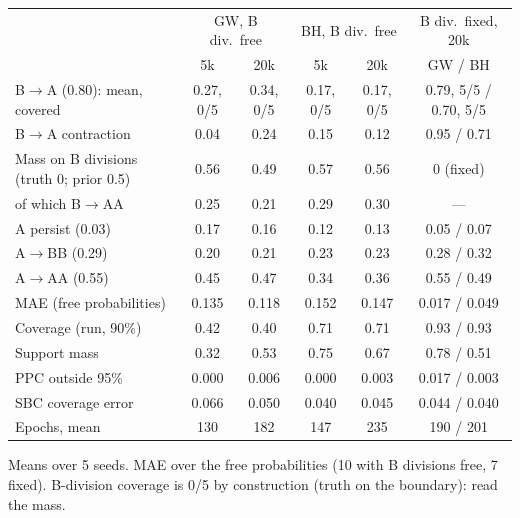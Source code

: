 \documentclass[10pt,a4paper]{article}
\newcommand{\blk}[1]{\par\needspace{5\baselineskip}\smallskip{\sffamily\bfseries\color{inkgray}#1}\par}
\newcommand{\Comment}{\blk{Comment}}
\renewcommand{\blk}[1]{\par\Needspace*{5\baselineskip}\smallskip{\sffamily\bfseries\color{inkgray}#1}\par}
\begin{document}
\begin{center}\footnotesize
\begin{tabular}{@{}lccccc@{}}\toprule
 & \multicolumn{2}{c}{GW, B div.\ free} & \multicolumn{2}{c}{BH, B div.\ free} & B div.\ fixed, 20k \\
 & 5k & 20k & 5k & 20k & GW / BH \\\midrule
B$\to$A (0.80): mean, covered & 0.27, 0/5 & 0.34, 0/5 & 0.17, 0/5 & 0.17, 0/5 & 0.79, 5/5 / 0.70, 5/5 \\
B$\to$A contraction & 0.04 & 0.24 & 0.15 & 0.12 & 0.95 / 0.71 \\
Mass on B divisions (truth 0; prior 0.5) & 0.56 & 0.49 & 0.57 & 0.56 & 0 (fixed) \\
\quad of which B$\to$AA & 0.25 & 0.21 & 0.29 & 0.30 & --- \\
A persist (0.03) & 0.17 & 0.16 & 0.12 & 0.13 & 0.05 / 0.07 \\
A$\to$BB (0.29) & 0.20 & 0.21 & 0.23 & 0.23 & 0.28 / 0.32 \\
A$\to$AA (0.55) & 0.45 & 0.47 & 0.34 & 0.36 & 0.55 / 0.49 \\
MAE (free probabilities) & 0.135 & 0.118 & 0.152 & 0.147 & 0.017 / 0.049 \\
Coverage (run, 90\%) & 0.42 & 0.40 & 0.71 & 0.71 & 0.93 / 0.93 \\
Support mass & 0.32 & 0.53 & 0.75 & 0.67 & 0.78 / 0.51 \\
PPC outside 95\% & 0.000 & 0.006 & 0.000 & 0.003 & 0.017 / 0.003 \\
SBC coverage error & 0.066 & 0.050 & 0.040 & 0.045 & 0.044 / 0.040 \\
Epochs, mean & 130 & 182 & 147 & 235 & 190 / 201 \\\bottomrule
\end{tabular}

Means over 5 seeds. MAE over the free probabilities (10 with B divisions free, 7 fixed). B-division coverage is 0/5 by construction (truth on the boundary): read the mass.
\end{center}
\Comment
\end{document}
